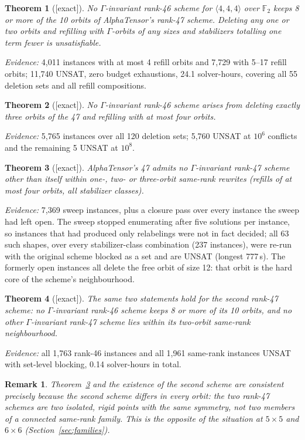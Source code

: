 \documentclass[11pt]{article}
\newtheorem{theorem}{Theorem}
\newtheorem{remark}{Remark}
\newcommand{\FF}{\mathbb{F}_2}
\newcommand{\tw}[3]{\langle #1,#2,#3\rangle}
\begin{document}
\begin{theorem}[{[exact]}]
\label{thm:t1}
No $\Gamma$-invariant rank-46 scheme for $\tw444$ over $\FF$ keeps 8 or more of the 10 orbits of
AlphaTensor's rank-47 scheme. Deleting any one or two orbits and refilling with $\Gamma$-orbits of any
sizes and stabilizers totalling one term fewer is unsatisfiable.
\end{theorem}
\noindent\emph{Evidence:} 4{,}011 instances with at most 4 refill orbits and 7{,}729 with 5--17 refill
orbits; 11{,}740 UNSAT, zero budget exhaustions, 24.1 solver-hours, covering all 55 deletion sets and all
refill compositions.

\begin{theorem}[{[exact]}]
\label{thm:t2}
No $\Gamma$-invariant rank-46 scheme arises from deleting exactly three orbits of the 47 and refilling
with at most four orbits.
\end{theorem}
\noindent\emph{Evidence:} 5{,}765 instances over all 120 deletion sets; 5{,}760 UNSAT at $10^6$
conflicts and the remaining 5 UNSAT at $10^8$.

\begin{theorem}[{[exact]}]
\label{thm:t3}
AlphaTensor's 47 admits no $\Gamma$-invariant rank-47 scheme other than itself within one-, two- or
three-orbit same-rank rewrites (refills of at most four orbits, all stabilizer classes).
\end{theorem}
\noindent\emph{Evidence:} 7{,}369 sweep instances, plus a closure pass over every instance the sweep had
left open. The sweep stopped enumerating after five solutions per instance, so instances that had
produced only relabelings were not in fact decided; all 63 such shapes, over every stabilizer-class
combination (237 instances), were re-run with the original scheme blocked as a set and are UNSAT
(longest 777\,s). The formerly open instances all delete the free orbit of size 12: that orbit is the
hard core of the scheme's neighbourhood.

\begin{theorem}[{[exact]}]
\label{thm:t47b}
The same two statements hold for the second rank-47 scheme: no $\Gamma$-invariant rank-46 scheme keeps 8
or more of its 10 orbits, and no other $\Gamma$-invariant rank-47 scheme lies within its two-orbit
same-rank neighbourhood.
\end{theorem}
\noindent\emph{Evidence:} all 1{,}763 rank-46 instances and all 1{,}961 same-rank instances UNSAT with
set-level blocking, 0.14 solver-hours in total.

\begin{remark}
Theorem~\ref{thm:t3} and the existence of the second scheme are consistent precisely because the second
scheme differs in \emph{every} orbit: the two rank-47 schemes are two isolated, rigid points with the
same symmetry, not two members of a connected same-rank family. This is the opposite of the situation at
$5\times5$ and $6\times6$ (Section~\ref{sec:families}).
\end{remark}
\end{document}
